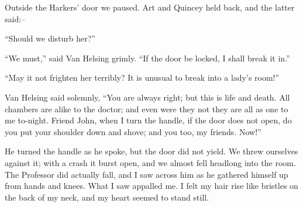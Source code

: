 \documentclass[12pt,openright]{book}
\begin{document}
Outside the Harkers’ door we paused. Art and Quincey held back, and the latter said:–

“Should we disturb her?”

“We must,” said Van Helsing grimly. “If the door be locked, I shall break it in.”

“May it not frighten her terribly? It is unusual to break into a lady’s room!”

Van Helsing said solemnly, “You are always right; but this is life and death. All chambers are alike to the doctor; and even were they not they are all as one to me to-night. Friend John, when I turn the handle, if the door does not open, do you put your shoulder down and shove; and you too, my friends. Now!”

He turned the handle as he spoke, but the door did not yield. We threw ourselves against it; with a crash it burst open, and we almost fell headlong into the room. The Professor did actually fall, and I saw across him as he gathered himself up from hands and knees. What I saw appalled me. I felt my hair rise like bristles on the back of my neck, and my heart seemed to stand still.
\end{document}
